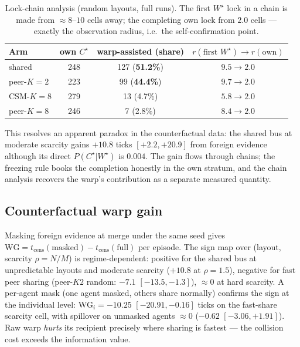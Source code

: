 \documentclass{article}
\newcommand{\wstar}{W^{\star}}
\newcommand{\cstar}{C^{\star}}
\begin{document}
\begin{table}[h]
\centering
\caption{Lock-chain analysis (random layouts, full runs). The first
$\wstar$ lock in a chain is made from ${\approx}8$--$10$ cells away;
the completing own lock from $2.0$ cells --- exactly the observation
radius, i.e.\ the self-confirmation point.}
\label{p2:tab:taxi}
\small
\begin{tabular}{lccc}
\toprule
Arm & own $\cstar$ & warp-assisted (share) & $r(\text{first }\wstar) \to r(\text{own})$ \\
\midrule
shared          & 248 & 127 (\textbf{51.2\%}) & $9.5 \to 2.0$ \\
peer-$K{=}2$    & 223 & 99 (\textbf{44.4\%})  & $9.7 \to 2.0$ \\
CSM-$K{=}8$     & 279 & 13 (4.7\%)            & $5.8 \to 2.0$ \\
peer-$K{=}8$    & 246 & 7 (2.8\%)             & $8.4 \to 2.0$ \\
\bottomrule
\end{tabular}
\end{table}

This resolves an apparent paradox in the counterfactual data: the
shared bus at moderate scarcity gains $+10.8$ ticks $[+2.2,+20.9]$
from foreign evidence although its direct $P(\cstar|\wstar)$ is
$0.004$. The gain flows through chains; the freezing rule books the
completion honestly in the own stratum, and the chain analysis
recovers the warp's contribution as a separate measured quantity.

\subsection{Counterfactual warp gain}
\label{p2:sec:gain}

Masking foreign evidence at merge under the same seed gives
$\mathrm{WG} = t_{\text{cens}}(\text{masked}) -
t_{\text{cens}}(\text{full})$ per episode. The sign map over (layout,
scarcity $\rho{=}N/M$) is regime-dependent: positive for the shared
bus at unpredictable layouts and moderate scarcity ($+10.8$ at
$\rho{=}1.5$), negative for fast peer sharing (peer-$K2$ random:
$-7.1$ $[-13.5,-1.3]$), ${\approx}0$ at hard scarcity. A per-agent
mask (one agent masked, others share normally) confirms the sign at
the individual level: $\mathrm{WG}_i = -10.25$ $[-20.91,-0.16]$ ticks
on the fast-share scarcity cell, with spillover on unmasked agents
${\approx}0$ ($-0.62$ $[-3.06,+1.91]$). Raw warp \emph{hurts} its
recipient precisely where sharing is fastest --- the collision cost
exceeds the information value. %
\end{document}
